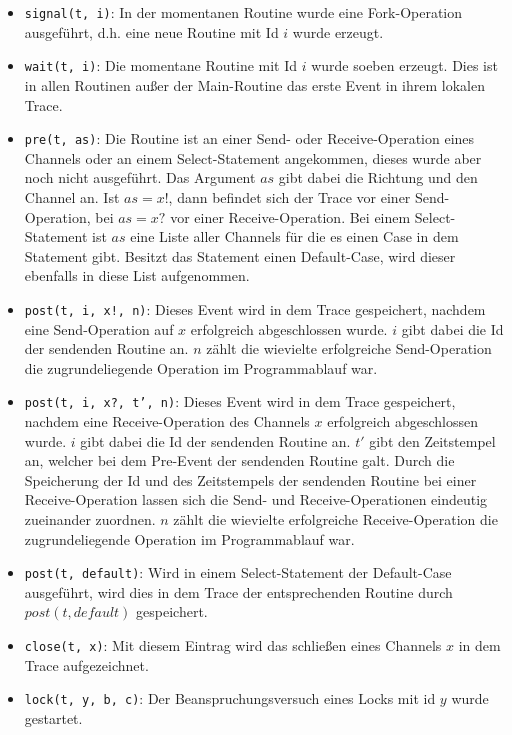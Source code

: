 \begin{itemize}
  \item \texttt{signal(t, i)}: In der momentanen Routine wurde
    eine Fork-Operation ausgeführt,
    d.h. eine neue Routine mit Id $i$ wurde erzeugt.
  \item \texttt{wait(t, i)}: Die momentane Routine mit Id $i$ wurde soeben erzeugt. Dies ist 
    in allen Routinen außer der Main-Routine das erste Event in ihrem lokalen Trace.
  \item \texttt{pre(t, as)}: Die Routine ist an einer Send- oder Receive-Operation eines 
    Channels oder an einem Select-Statement angekommen, dieses wurde aber noch nicht 
    ausgeführt. Das Argument $as$ gibt dabei die Richtung und den Channel an. 
    Ist $as = x!$, dann befindet sich der Trace vor einer Send-Operation, bei 
    $as = x?$ vor einer Receive-Operation. Bei einem Select-Statement ist 
    $as$ eine Liste aller Channels für die es einen 
    Case in dem Statement gibt. Besitzt das Statement einen Default-Case, wird
    dieser ebenfalls in diese List aufgenommen.
  \item \texttt{post(t, i, x!, n)}: Dieses Event wird in dem Trace gespeichert, nachdem 
    eine Send-Operation auf $x$ erfolgreich abgeschlossen wurde. 
    $i$ gibt dabei die Id der sendenden Routine an. $n$ zählt die wievielte 
    erfolgreiche Send-Operation die zugrundeliegende Operation im Programmablauf war.
  \item \texttt{post(t, i, x?, t', n)}: Dieses Event wird in dem Trace gespeichert, nachdem 
    eine Receive-Operation des Channels $x$ erfolgreich abgeschlossen wurde. 
    $i$ gibt dabei die Id der sendenden Routine an. $t'$ gibt den Zeitstempel an,
    welcher bei dem Pre-Event der sendenden Routine galt. Durch die Speicherung der Id und des 
    Zeitstempels der sendenden Routine bei einer Receive-Operation lassen sich 
    die Send- und Receive-Operationen eindeutig zueinander zuordnen. $n$ zählt die wievielte 
    erfolgreiche Receive-Operation die zugrundeliegende Operation im Programmablauf war.
  \item \texttt{post(t, default)}: Wird in einem Select-Statement der Default-Case ausgeführt,
    wird dies in dem Trace der entsprechenden Routine durch $post(t, default)$ 
    gespeichert.
  \item \texttt{close(t, x)}: Mit diesem Eintrag wird das schließen eines Channels $x$ 
    in dem Trace aufgezeichnet.
  \item \texttt{lock(t, y, b, c)}: Der Beanspruchungsversuch eines Locks mit id $y$ wurde gestartet. 

\end{itemize}
